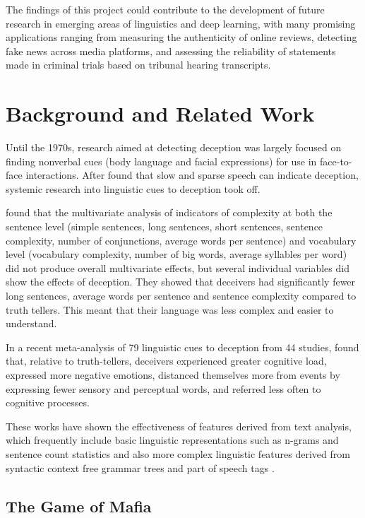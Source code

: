 \documentclass[11pt,a4paper]{article}
\begin{document}
The findings of this project could contribute to the development of future research in emerging areas of linguistics and deep learning, with many promising applications ranging from measuring the authenticity of online reviews, detecting fake news across media platforms, and assessing the reliability of statements made in criminal trials based on tribunal hearing transcripts.

\section{Background and Related Work}

Until the 1970s, research aimed at detecting deception was largely focused on finding nonverbal cues (body language and facial expressions) for use in face-to-face interactions. After \citet{Mehrabian} found that slow and sparse speech can indicate deception, systemic research into linguistic cues to deception took off.

\citet{Burgoon} found that the multivariate analysis of indicators of complexity at both the sentence level (simple sentences, long sentences, short sentences, sentence complexity, number of conjunctions, average words per sentence) and vocabulary level (vocabulary complexity, number of big words, average syllables per word) did not produce overall multivariate effects, but several individual variables did show the effects of deception. They showed that deceivers had significantly fewer long sentences, average words per sentence and sentence complexity compared to truth tellers. This meant that their language was less complex and easier to understand.

In a recent meta-analysis of 79 linguistic cues to deception from 44 studies, \citet{Hauch} found that, relative to truth-tellers, deceivers experienced greater cognitive load, expressed more negative emotions, distanced themselves more from events by expressing fewer sensory and perceptual words, and referred less often to cognitive processes.

These works have shown the effectiveness of features derived from text analysis, which frequently include basic linguistic representations such as n-grams and sentence count statistics \cite{Mihalcea, Ott} and also more complex linguistic features derived from syntactic context free grammar trees and part of speech tags \cite{Feng}.

\subsection{The Game of Mafia}
\end{document}
